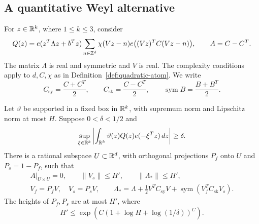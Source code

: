 \subsection{A quantitative Weyl alternative}

For \(z\in\mathbb R^k\), where \(1\le k\le3\), consider
\[
 Q(z)=e(z^T\Lambda z+b^Tz)
       \sum_{n\in\mathbb Z^d}\chi(Vz-n)
                   e\bigl((Vz)^TC(Vz-n)\bigr),
 \qquad A=C-C^T.
\]
The matrix \(\Lambda\) is real and symmetric and \(V\) is real.
The complexity conditions apply to \(d,C,\chi\) as in
Definition~\ref{def:quadratic-atom}.  We write
\[
 C_{\mathrm{sy}}=\frac{C+C^T}{2},\qquad
 C_{\mathrm{sk}}=\frac{C-C^T}{2},\qquad
 \operatorname{sym}B=\frac{B+B^T}{2}.
\]

\begin{lemma}\label{lem:weyl}
Let \(\vartheta\) be supported in a fixed box in \(\mathbb R^k\), with
supremum norm and Lipschitz norm at most \(H\).
Suppose \(0<\delta<1/2\) and
\[
 \sup_{\xi\in\mathbb R^k}
 \left|\int_{\mathbb R^k}\vartheta(z)Q(z)e(-\xi^Tz)\,dz\right|
 \ge\delta .
\]
There is a rational subspace \(U\subset\mathbb R^d\), with orthogonal
projections \(P_f\) onto \(U\) and \(P_s=1-P_f\), such that
\begin{equation*}
 \begin{gathered}
 A|_{U\times U}=0,\qquad \|V_s\|\le H',\qquad
 \|\Lambda_*\|\le H',\\
 V_f=P_fV,\quad V_s=P_sV,\qquad
 \Lambda_*=\Lambda+\tfrac12V^TC_{\mathrm{sy}}V+
                     \operatorname{sym}(V_f^TC_{\mathrm{sk}}V_s).
 \end{gathered}
 \tag{2}\label{eq:src-2}
\end{equation*}
The heights of \(P_f,P_s\) are at most \(H'\), where
\[
 H'\le
 \exp\!\left(C(1+\log H+\log(1/\delta))^C\right).
\]
\end{lemma}

